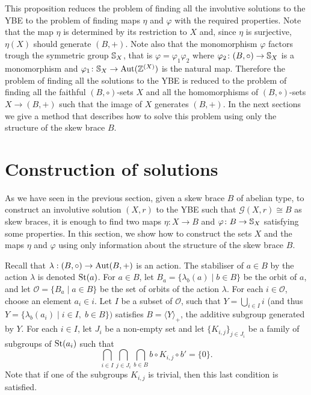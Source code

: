 This proposition  reduces the problem of finding all the involutive solutions
to the YBE to the problem of finding   maps $\eta$ and $\varphi$ with
the required properties. Note that the map $\eta$ is determined by
its restriction to $X$ and, since $\eta$ is surjective, $\eta(X)$
should generate $(B,+)$. Note also that the monomorphism $\varphi$
factors trough the symmetric group $\mathbb{S}_X$, that is
$\varphi=\varphi_1\varphi_2$ where $\varphi_2\colon
(B,\circ)\to \mathbb{S}_X$ is a monomorphism and
$\varphi_1\colon \mathbb{S}_X\to \operatorname{Aut}(\mathbb{Z}^{(X)})$ is the
natural map. Therefore the problem of finding all the solutions to
the YBE is reduced to the problem of finding all the faithful
$(B,\circ)$-sets $X$ and all the homomorphisms of $(B,\circ)$-sets
$X\to (B,+)$ such that the image of $X$ generates
$(B,+)$. In the next sections we give a method that describes how to
solve this problem using only  the structure of the skew brace $B$.



\section{Construction of solutions}\label{construcsec3}
As we have seen in the previous section, given a skew brace $B$ of abelian type, to
construct an involutive solution $(X,r)$ to the YBE such that
$\mathcal{G}(X,r)\cong B$ as skew braces, it is enough to find two  maps
$\eta\colon X\to B$ and $\varphi\colon B\to \mathbb{S}_X$ satisfying some properties. In this section, we show how to
construct the sets $X$ and the maps $\eta$ and $\varphi$ using only
information about the structure of the skew brace $B$.

Recall that $\lambda : (B,\circ ) \to \operatorname{Aut}(B,+)$ is an
action. The stabiliser of $a\in B$ by the action $\lambda$ is
denoted $\operatorname{St}(a)$. For $a\in B$, let $B_a=\{\lambda_b(a)\mid b\in
B\}$ be the orbit of $a$, and let $\mathcal{O}=\{ B_a\mid a\in B\}$
be the set of orbits of the action $\lambda$.  For each $i\in
\mathcal{O}$, choose an element $a_i\in i$. Let $I$ be a subset of
$\mathcal{O}$, such that $Y=\bigcup_{i\in I}i$  (and thus
$Y=\{\lambda_b(a_i)\mid i\in I,\; b\in B\} )$
satisfies $B=\langle
Y\rangle_+$, the additive subgroup generated by $Y$. For each $i\in
I$, let $J_i$ be a non-empty set and  let $\{ K_{i,j} \}_{j\in J_i}$
be a family of subgroups of $\operatorname{St}(a_i)$ such that
$$\bigcap_{i\in I}\bigcap_{j\in J_i}\bigcap_{b\in B}b\circ K_{i,j}\circ b'=\{ 0\}.$$
Note that if one of the subgroups $K_{i,j}$ is trivial, then this
last condition is satisfied.


